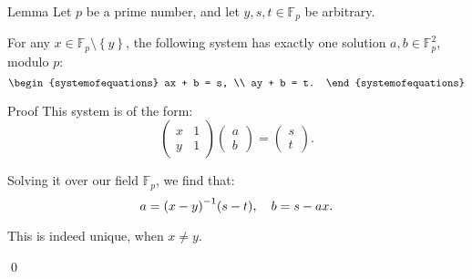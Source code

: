 \documentclass[a4paper]{article}
\begin{document}
\begin{parag}{Lemma}
    Let $p$ be a prime number, and let $y, s, t \in \mathbb{F}_p$ be arbitrary.

    For any $x \in \mathbb{F}_p \setminus \left\{y\right\}$, the following system has exactly one solution $a, b \in \mathbb{F}_p^2$, modulo $p$: 
    \[\begin{systemofequations} ax + b = s, \\ ay + b = t. \end{systemofequations}\]

    \begin{subparag}{Proof}
        This system is of the form: 
        \[\begin{pmatrix} x & 1 \\ y & 1 \end{pmatrix} \begin{pmatrix} a \\ b \end{pmatrix}  = \begin{pmatrix} s \\ t \end{pmatrix}.\]

        Solving it over our field $\mathbb{F}_p$, we find that: 
        \[a = \left(x-y\right)^{-1} \left(s - t\right), \mathspace b = s - ax.\]

        This is indeed unique, when $x \neq y$.

        \qed
    \end{subparag}
\end{parag}
\end{document}
